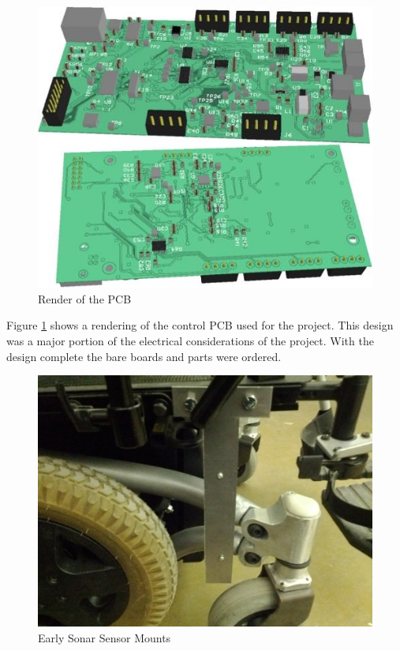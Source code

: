 \documentclass[oneside,final,a4paper]{report}
\begin{document}
\begin{figure}[hbt]
 \centering
 \includegraphics[scale=0.35]{PCB_Render}
 \caption{Render of the PCB}
 \label{fig:PCB_Render}
\end{figure}

Figure \ref{fig:PCB_Render} shows a rendering of the control PCB used for the project. This design was a major portion of the electrical considerations of the project. With the design complete the bare boards and parts were ordered.

\begin{figure}[hbt]
 \centering
 \includegraphics[scale=0.35]{Sensor_Mount}
 \caption{Early Sonar Sensor Mounts}
 \label{fig:sonar_mounts_early}
\end{figure}
\end{document}
